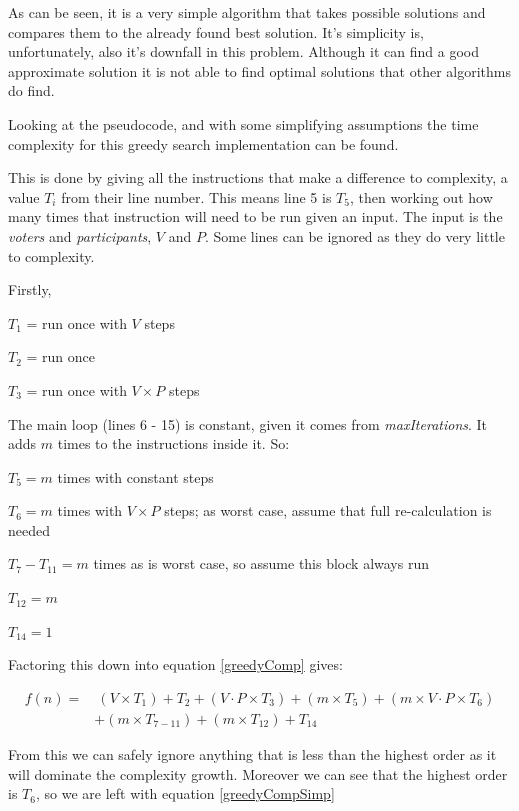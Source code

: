 \documentclass[12pt]{report}
\begin{document}
As can be seen, it is a very simple algorithm that takes possible solutions and compares them to the already found best solution. It's simplicity is, unfortunately, also it's downfall in this problem. Although it can find a good approximate solution it is not able to find optimal solutions that other algorithms do find.

Looking at the pseudocode, and with some simplifying assumptions the time complexity for this greedy search implementation can be found.

This is done by giving all the instructions that make a difference to complexity, a value $T_i$ from their line number. This means line 5 is $T_5$, then working out how many times that instruction will need to be run given an input. The input is the \textit{voters} and \textit{participants}, $V$ and $P$. Some lines can be ignored as they do very little to complexity.

Firstly,

$T_1$ = run once with $V$ steps

$T_2$ = run once

$T_3$ = run once with $V \times P$ steps

The main loop (lines 6 - 15) is constant, given it comes from \textit{maxIterations}. It adds $m$ times to the instructions inside it. So:

$T_5 = m$ times with constant steps

$T_6 = m$ times with $V \times P$ steps; as worst case, assume that full re-calculation is needed

$T_7 - T_{11}= m$ times as is worst case, so assume this block always run

$T_{12}= m$

$T_{14} = 1$

Factoring this down into equation \ref{greedyComp} gives: 

\begin{equation}\label{greedyComp}
\begin{aligned}
	f(n) ={} & \ (V \times T_1) + T_2 + (V \cdot P \times T_3) + (m \times T_5) + (m \times V \cdot P \times T_6) \\
	 	& + (m \times T_{7 - 11}) + (m \times T_{12}) + T_{14}
\end{aligned}
\end{equation}

From this we can safely ignore anything that is less than the highest order as it will dominate the complexity growth. Moreover we can see that the highest order is $T_6$, so we are left with equation \ref{greedyCompSimp}
\end{document}
